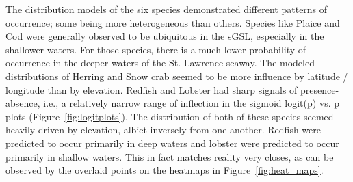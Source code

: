 The distribution models of the six species demonstrated different patterns of occurrence; some being more heterogeneous than others.
Species like Plaice and Cod were generally observed to be ubiquitous in the sGSL, especially in the shallower waters.
For those species, there is a much lower probability of occurrence in the deeper waters of the St. Lawrence seaway.
The modeled distributions of Herring and Snow crab seemed to be more influence by latitude / longitude than by elevation.
Redfish and Lobster had sharp signals of presence-absence, i.e., a relatively narrow range of inflection in the sigmoid
logit(p) vs. p plots (Figure~\ref{fig:logitplots}).
The distribution of both of these species seemed heavily driven by elevation, albiet inversely from one another.
Redfish were predicted to occur primarily in deep waters and lobster were predicted to occur primarily in shallow waters.
This in fact matches reality very closes, as can be observed by the overlaid points on the heatmaps in Figure~\ref{fig:heat_maps}.



